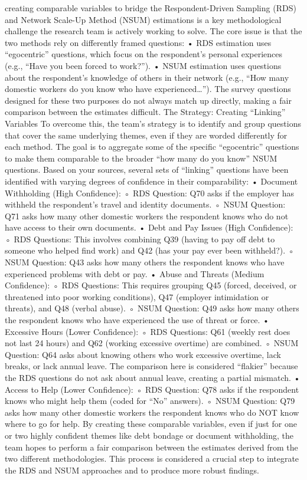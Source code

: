 \documentclass[
  12pt,
  letterpaper,
  DIV=11,
  numbers=noendperiod]{scrartcl}
\theoremstyle{plain}
\theoremstyle{definition}
\begin{document}
creating comparable variables to bridge the Respondent-Driven Sampling
(RDS) and Network Scale-Up Method (NSUM) estimations is a key
methodological challenge the research team is actively working to solve.
The core issue is that the two methods rely on differently framed
questions: • RDS estimation uses ``egocentric'' questions, which focus
on the respondent's personal experiences (e.g., ``Have you been forced
to work?''). • NSUM estimation uses questions about the respondent's
knowledge of others in their network (e.g., ``How many domestic workers
do you know who have experienced\ldots{}''). The survey questions
designed for these two purposes do not always match up directly, making
a fair comparison between the estimates difficult. The Strategy:
Creating ``Linking'' Variables To overcome this, the team's strategy is
to identify and group questions that cover the same underlying themes,
even if they are worded differently for each method. The goal is to
aggregate some of the specific ``egocentric'' questions to make them
comparable to the broader ``how many do you know'' NSUM questions. Based
on your sources, several sets of ``linking'' questions have been
identified with varying degrees of confidence in their comparability: •
Document Withholding (High Confidence): ◦ RDS Question: Q70 asks if the
employer has withheld the respondent's travel and identity documents. ◦
NSUM Question: Q71 asks how many other domestic workers the respondent
knows who do not have access to their own documents. • Debt and Pay
Issues (High Confidence): ◦ RDS Questions: This involves combining Q39
(having to pay off debt to someone who helped find work) and Q42 (has
your pay ever been withheld?). ◦ NSUM Question: Q43 asks how many others
the respondent knows who have experienced problems with debt or pay. •
Abuse and Threats (Medium Confidence): ◦ RDS Questions: This requires
grouping Q45 (forced, deceived, or threatened into poor working
conditions), Q47 (employer intimidation or threats), and Q48 (verbal
abuse). ◦ NSUM Question: Q49 asks how many others the respondent knows
who have experienced the use of threat or force. • Excessive Hours
(Lower Confidence): ◦ RDS Questions: Q61 (weekly rest does not last 24
hours) and Q62 (working excessive overtime) are combined. ◦ NSUM
Question: Q64 asks about knowing others who work excessive overtime,
lack breaks, or lack annual leave. The comparison here is considered
``flakier'' because the RDS questions do not ask about annual leave,
creating a partial mismatch. • Access to Help (Lower Confidence): ◦ RDS
Question: Q78 asks if the respondent knows who might help them (coded
for ``No'' answers). ◦ NSUM Question: Q79 asks how many other domestic
workers the respondent knows who do NOT know where to go for help. By
creating these comparable variables, even if just for one or two highly
confident themes like debt bondage or document withholding, the team
hopes to perform a fair comparison between the estimates derived from
the two different methodologies. This process is considered a crucial
step to integrate the RDS and NSUM approaches and to produce more robust
findings.
\end{document}
